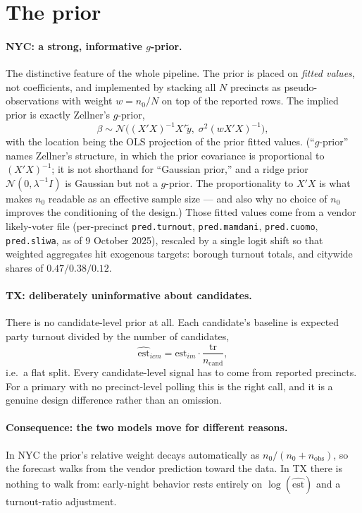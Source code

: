 \documentclass[11pt]{article}
\newcommand{\Norm}{\mathcal{N}}
\begin{document}
\section{The prior}\label{sec:prior}

\paragraph{NYC: a strong, informative $g$-prior.} The distinctive feature of the whole
pipeline. The prior is placed on \emph{fitted values}, not coefficients, and implemented by
stacking all $N$ precincts as pseudo-observations with weight $w = n_0/N$ on top of the
reported rows. The implied prior is exactly Zellner's $g$-prior,
\begin{equation}
  \beta \sim \Norm\!\big((X'X)^{-1}X'\tilde y,\; \sigma^2 (w X'X)^{-1}\big),
\end{equation}
with the location being the OLS projection of the prior fitted values. (``$g$-prior'' names
Zellner's structure, in which the prior covariance is proportional to $(X'X)^{-1}$; it is
not shorthand for ``Gaussian prior,'' and a ridge prior $\Norm(0,\lambda^{-1}I)$ is
Gaussian but not a $g$-prior. The proportionality to $X'X$ is what makes $n_0$ readable as
an effective sample size --- and also why no choice of $n_0$ improves the conditioning of
the design.) Those fitted values
come from a vendor likely-voter file (per-precinct \texttt{pred.turnout},
\texttt{pred.mamdani}, \texttt{pred.cuomo}, \texttt{pred.sliwa}, as of 9 October 2025),
rescaled by a single logit shift so that weighted aggregates hit exogenous targets:
borough turnout totals, and citywide shares of $0.47/0.38/0.12$.

\paragraph{TX: deliberately uninformative about candidates.} There is no candidate-level
prior at all. Each candidate's baseline is expected party turnout divided by the number of
candidates,
\begin{equation}
  \widehat{\textrm{est}}_{icm} = \textrm{est}_{im} \cdot \frac{\textrm{tr}}{n_{\textrm{cand}}},
\end{equation}
i.e.\ a flat split. Every candidate-level signal has to come from reported precincts. For a
primary with no precinct-level polling this is the right call, and it is a genuine design
difference rather than an omission.

\paragraph{Consequence: the two models move for different reasons.} In NYC the prior's
relative weight decays automatically as $n_0/(n_0 + n_{\textrm{obs}})$, so the forecast
walks from the vendor prediction toward the data. In TX there is nothing to walk from:
early-night behavior rests entirely on $\log(\widehat{\textrm{est}})$ and a turnout-ratio
adjustment.
\end{document}
